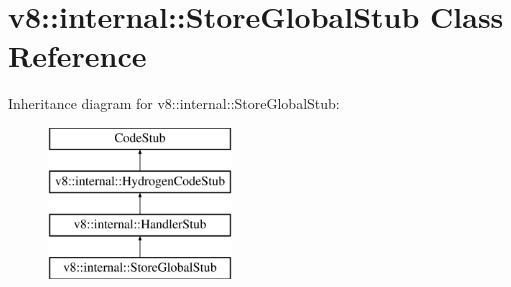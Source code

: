 \hypertarget{classv8_1_1internal_1_1_store_global_stub}{}\section{v8\+:\+:internal\+:\+:Store\+Global\+Stub Class Reference}
\label{classv8_1_1internal_1_1_store_global_stub}
Inheritance diagram for v8\+:\+:internal\+:\+:Store\+Global\+Stub\+:\begin{figure}[H]
\begin{center}
\leavevmode
\includegraphics[height=4.000000cm]{classv8_1_1internal_1_1_store_global_stub}
\end{center}
\end{figure}
